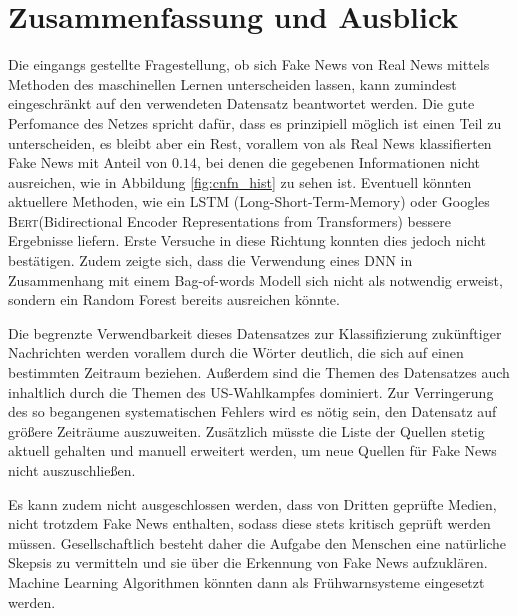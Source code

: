 \chapter{Zusammenfassung und Ausblick}
Die eingangs gestellte Fragestellung, ob sich Fake News von Real News mittels 
Methoden des maschinellen Lernen unterscheiden lassen, kann zumindest eingeschränkt
auf den verwendeten Datensatz beantwortet werden. Die gute Perfomance des Netzes spricht 
dafür, dass es prinzipiell möglich ist einen Teil zu unterscheiden, es bleibt aber ein 
Rest, vorallem von als Real News klassifierten Fake News mit Anteil von $0.14$, bei 
denen die gegebenen Informationen nicht ausreichen, wie in Abbildung \ref{fig:cnfn_hist}
zu sehen ist. Eventuell könnten aktuellere Methoden, wie ein LSTM (Long-Short-Term-Memory)
oder Googles \textsc{Bert}(Bidirectional Encoder Representations from Transformers) bessere
Ergebnisse liefern. Erste Versuche in diese Richtung konnten dies jedoch nicht bestätigen.
Zudem zeigte sich, dass die Verwendung eines DNN in Zusammenhang mit einem Bag-of-words Modell
sich nicht als notwendig erweist, sondern ein Random Forest bereits ausreichen könnte.

Die begrenzte Verwendbarkeit dieses Datensatzes zur Klassifizierung zukünftiger Nachrichten  
werden vorallem durch die Wörter deutlich, die sich auf einen bestimmten Zeitraum beziehen.
Außerdem sind die Themen des Datensatzes auch inhaltlich durch die Themen des US-Wahlkampfes 
dominiert. Zur Verringerung des so begangenen systematischen Fehlers wird es nötig sein,
den Datensatz auf größere Zeiträume auszuweiten. Zusätzlich müsste die Liste der Quellen
stetig aktuell gehalten und manuell erweitert werden, um neue Quellen für Fake News 
nicht auszuschließen. 

Es kann zudem nicht ausgeschlossen werden, dass von Dritten geprüfte Medien, nicht trotzdem
Fake News enthalten, sodass diese stets kritisch geprüft werden müssen. Gesellschaftlich
besteht daher die Aufgabe den Menschen eine natürliche Skepsis zu vermitteln und sie über 
die Erkennung von Fake News aufzuklären. Machine Learning Algorithmen könnten dann als 
Frühwarnsysteme eingesetzt werden.